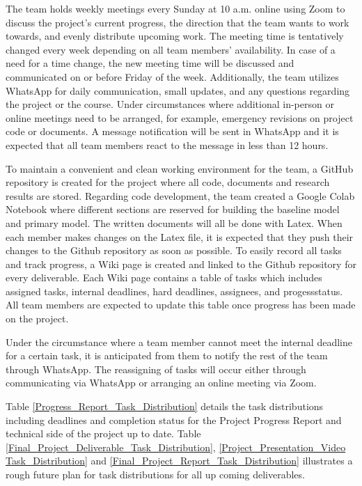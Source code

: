 \documentclass{article} %
\begin{document}
The team holds weekly meetings every Sunday at 10 a.m. online using Zoom to discuss the project's current progress, the direction that the team wants to work towards, and evenly distribute upcoming work. The meeting time is tentatively changed every week depending on all team members’ availability. In case of a need for a time change, the new meeting time will be discussed and communicated on or before Friday of the week. Additionally, the team utilizes WhatsApp for daily communication, small updates, and any questions regarding the project or the course. Under circumstances where additional in-person or online meetings need to be arranged, for example, emergency revisions on project code or documents. A message notification will be sent in WhatsApp and it is expected that all team members react to the message in less than 12 hours.

To maintain a convenient and clean working environment for the team, a GitHub repository is created for the project where all code, documents and research results are stored. Regarding code development, the team created a Google Colab Notebook where different sections are reserved for building the baseline model and primary model. The written documents will all be done with Latex. When each member makes changes on the Latex file, it is expected that they push their changes to the Github repository as soon as possible. To easily record all tasks and track progress, a Wiki page is created and linked to the Github repository for every deliverable. Each Wiki page contains a table of tasks which includes assigned tasks, internal deadlines, hard deadlines, assignees, and  progessstatus. All team members are expected to update this table once progress has been made on the project.

Under the circumstance where a team member cannot meet the internal deadline for a certain task, it is anticipated from them to notify the rest of the team through WhatsApp. The reassigning of tasks will occur either through communicating via WhatsApp or arranging an online meeting via Zoom.

Table \ref{Progress_Report_Task_Distribution} details the task distributions including deadlines and completion status for the Project Progress Report and technical side of the project up to date. Table \ref{Final_Project_Deliverable_Task_Distribution}, \ref{Project_Presentation_Video Task_Distribution} and \ref{Final_Project_Report_Task_Distribution} illustrates a rough future plan for task distributions for all up coming deliverables. 
\end{document}
